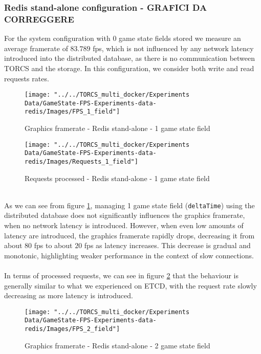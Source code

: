 \subsubsection{Redis stand-alone configuration - GRAFICI DA CORREGGERE}
For the system configuration with 0 game state fields stored we measure an average framerate of $83.789$ fps, which is not influenced by any network latency introduced into the distributed database, as there is no communication between TORCS and the storage. In this configuration, we consider both write and read requests rates.
\begin{figure}[h!]
	\centering
	\texttt{[image: "../../TORCS\_multi\_docker/Experiments Data/GameState-FPS-Experiments-data-redis/Images/FPS\_1\_field"]}
	\caption[Graphics framerate - Redis stand-alone - 1 game state field]{Graphics framerate - Redis stand-alone - 1 game state field}
	\label{fig:fps-1-field-redis}
\end{figure}
\begin{figure}[h!]
	\centering
	\texttt{[image: "../../TORCS\_multi\_docker/Experiments Data/GameState-FPS-Experiments-data-redis/Images/Requests\_1\_field"]}
	\caption[Requests processed - Redis stand-alone - 1 game state field]{Requests processed - Redis stand-alone - 1 game state field}
	\label{fig:requests-1-field-redis}
\end{figure}
\\ As we can see from figure \ref{fig:fps-1-field-redis}, managing 1 game state field (\texttt{deltaTime}) using the distributed database does not significantly influences the graphics framerate, when no network latency is introduced. However, when even low amounts of latency are introduced, the graphics framerate rapidly drops, decreasing it from about $80$ fps to about $20$ fps as latency increases. This decrease is gradual and monotonic, highlighting weaker performance in the context of slow connections. \\ \\
In terms of processed requests, we can see in figure \ref{fig:requests-1-field-redis} that the behaviour is generally similar to what we experienced on ETCD, with the request rate slowly decreasing as more latency is introduced. \\
\begin{figure}[h!]
	\centering
	\texttt{[image: "../../TORCS\_multi\_docker/Experiments Data/GameState-FPS-Experiments-data-redis/Images/FPS\_2\_field"]}
	\caption[Graphics framerate - Redis stand-alone - 2 game state field]{Graphics framerate - Redis stand-alone - 2 game state field}
	\label{fig:fps-2-field-redis}
\end{figure}
